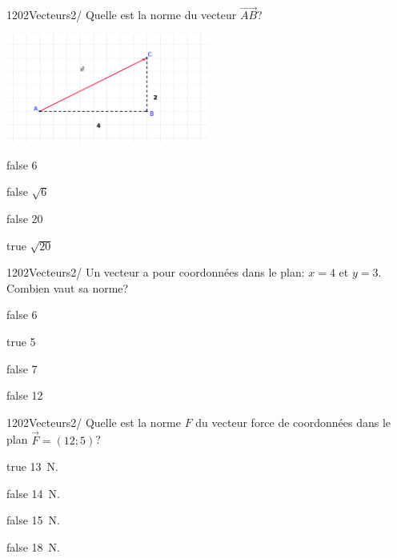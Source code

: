 \documentclass[11pt]{article}
\begin{document}
            \begin{question}{1202}{Vecteurs}{2}{/}
                Quelle est la norme du vecteur $\vec{AB}$?
                \begin{center}
                	\includegraphics[width=0.5\textwidth]{Philippe/Figures_Philippe/vecteurs_4_2.png}
                \end{center}
            \end{question}

            \begin{reponses}
                \item[false] 6
                \item[false] $\sqrt{6}$
                \item[false] $20$
                \item[true] $\sqrt{20}$ 
            \end{reponses}

            \begin{question}{1202}{Vecteurs}{2}{/}
                Un vecteur a pour coordonnées dans le plan: $x = 4$ et $y = 3$. Combien vaut sa norme?
            \end{question}

            \begin{reponses}
                \item[false] 6
                \item[true] 5
                \item[false] 7
                \item[false] 12
            \end{reponses}

            \begin{question}{1202}{Vecteurs}{2}{/}
                Quelle est la norme $F$ du vecteur force de coordonnées dans le plan $\vec{F}=(12;5)$?
            \end{question}

            \begin{reponses}
                \item[true] \SI{13}{\newton}.
                \item[false] \SI{14}{\newton}.
                \item[false] \SI{15}{\newton}.
                \item[false] \SI{18}{\newton}.
            \end{reponses}
\end{document}
